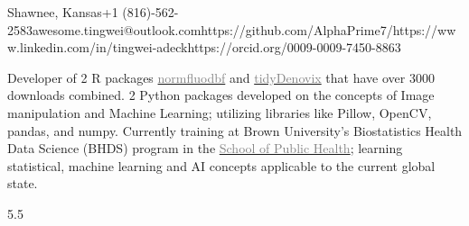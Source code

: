 \documentclass[9pt]{adeckcv} %
\begin{document}
  
{Shawnee, Kansas}{+1 (816)-562-2583}{awesome.tingwei@outlook.com}{https://github.com/AlphaPrime7/}{https://www.linkedin.com/in/tingwei-adeck}{https://orcid.org/0009-0009-7450-8863}

  

\begin{minipage}[t]{0.4\textwidth}
\vspace{-\baselineskip} 

{Developer of 2 R packages \href{https://alphaprime7.github.io/normfluodbf/}{\textcolor{gray}{normfluodbf}} and \href{https://alphaprime7.github.io/tidyDenovix/}{\textcolor{gray}{tidyDenovix}} that have over 3000 downloads combined. 2 Python packages developed on the concepts of Image manipulation and Machine Learning; utilizing libraries like Pillow, OpenCV, pandas, and numpy. }
{Currently training at Brown University's Biostatistics Health Data Science (BHDS) program in the \href{https://sph.brown.edu/}{\textcolor{gray}{School of Public Health}}; \space learning statistical, machine learning and AI concepts applicable to the current global state. }
\end{minipage}
\hfill %
\begin{minipage}[t]{0.5\textwidth} %
	\vspace{-\baselineskip} %
	\begin{barchart}{5.5}
	\end{barchart}
\end{minipage}
\end{document}
